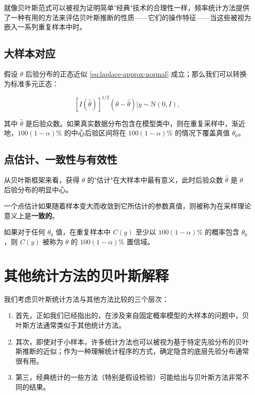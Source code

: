 就像贝叶斯范式可以被视为证明简单"经典"技术的合理性一样，频率统计方法提供了一种有用的方法来评估贝叶斯推断的性质——它们的操作特征——当这些被视为嵌入一系列重复样本中时。

\subsection{大样本对应}

假设 $\theta$ 后验分布的正态近似 \cref{eq:laplace-approx-normal} 成立；那么我们可以转换为标准多元正态：

\[
[I(\hat{\theta})]^{1/2}(\theta - \hat{\theta}) | y \sim \mathrm{N}(0, I), \label{eq:standard-normal-approx}
\]

其中 $\hat{\theta}$ 是后验众数。如果真实数据分布包含在模型类中，则在重复采样中，渐近地，$100(1-\alpha)\%$ 的中心后验区间将在 $100(1-\alpha)\%$ 的情况下覆盖真值 $\theta_0$。

\subsection{点估计、一致性与有效性}

从贝叶斯框架来看，获得 $\theta$ 的"估计"在大样本中最有意义，此时后验众数 $\hat{\theta}$ 是 $\theta$ 后验分布的明显中心。

一个点估计如果随着样本变大而收敛到它所估计的参数真值，则被称为在采样理论意义上是\textbf{一致的}。

如果对于任何 $\theta_0$ 值，在重复样本中 $C(y)$ 至少以 $100(1-\alpha)\%$ 的概率包含 $\theta_0$，则 $C(y)$ 被称为 $\theta$ 的 $100(1-\alpha)\%$ 置信域。

\section{其他统计方法的贝叶斯解释}

我们考虑贝叶斯统计方法与其他方法比较的三个层次：

\begin{enumerate}
  \item 首先，正如我们已经指出的，在涉及来自固定概率模型的大样本的问题中，贝叶斯方法通常类似于其他统计方法。
  \item 其次，即使对于小样本，许多统计方法也可以被视为基于特定先验分布的贝叶斯推断的近似；作为一种理解统计程序的方式，确定隐含的底层先验分布通常很有用。
  \item 第三，经典统计的一些方法（特别是假设检验）可能给出与贝叶斯方法非常不同的结果。
\end{enumerate}

